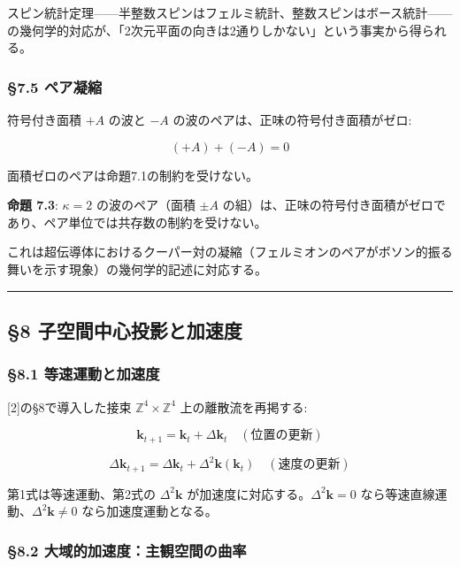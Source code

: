 \documentclass[
  a4paper,11pt]{ltjsarticle}
\theoremstyle{definition}
\theoremstyle{remark}
\begin{document}
スピン統計定理------半整数スピンはフェルミ統計、整数スピンはボース統計------の幾何学的対応が、「2次元平面の向きは2通りしかない」という事実から得られる。

\subsubsection{§7.5 ペア凝縮}\label{ux30daux30a2ux51ddux7e2e}

符号付き面積 \(+A\) の波と \(-A\)
の波のペアは、正味の符号付き面積がゼロ:

\[(+A) + (-A) = 0\]

面積ゼロのペアは命題7.1の制約を受けない。

\textbf{命題 7.3}: \(\kappa = 2\) の波のペア（面積 \(\pm A\)
の組）は、正味の符号付き面積がゼロであり、ペア単位では共存数の制約を受けない。

これは超伝導体におけるクーパー対の凝縮（フェルミオンのペアがボソン的振る舞いを示す現象）の幾何学的記述に対応する。

\begin{center}\rule{0.5\linewidth}{0.5pt}\end{center}

\subsection{§8
子空間中心投影と加速度}\label{ux5b50ux7a7aux9593ux4e2dux5fc3ux6295ux5f71ux3068ux52a0ux901fux5ea6}

\subsubsection{§8.1
等速運動と加速度}\label{ux7b49ux901fux904bux52d5ux3068ux52a0ux901fux5ea6}

{[}2{]}の§8で導入した接束 \(\mathbb{Z}^4 \times \mathbb{Z}^4\)
上の離散流を再掲する:

\[\mathbf{k}_{t+1} = \mathbf{k}_t + \Delta\mathbf{k}_t \quad (\text{位置の更新})\]

\[\Delta\mathbf{k}_{t+1} = \Delta\mathbf{k}_t + \Delta^2\mathbf{k}(\mathbf{k}_t) \quad (\text{速度の更新})\]

第1式は等速運動、第2式の \(\Delta^2\mathbf{k}\)
が加速度に対応する。\(\Delta^2\mathbf{k} = 0\)
なら等速直線運動、\(\Delta^2\mathbf{k} \neq 0\) なら加速度運動となる。

\subsubsection{§8.2
大域的加速度：主観空間の曲率}\label{ux5927ux57dfux7684ux52a0ux901fux5ea6ux4e3bux89b3ux7a7aux9593ux306eux66f2ux7387}
\end{document}
